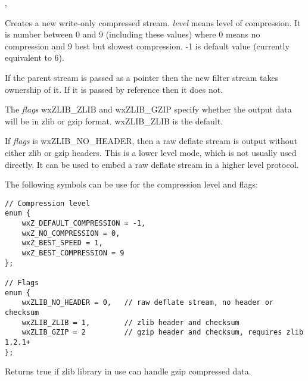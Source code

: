 


,



\label{wxzliboutputstreamwxzliboutputstream}



Creates a new write-only compressed stream. {\it level} means level of 
compression. It is number between 0 and 9 (including these values) where
0 means no compression and 9 best but slowest compression. -1 is default
value (currently equivalent to 6).

If the parent stream is passed as a pointer then the new filter stream
takes ownership of it. If it is passed by reference then it does not.

The {\it flags} wxZLIB\_ZLIB and wxZLIB\_GZIP specify whether the output data
will be in zlib or gzip format. wxZLIB\_ZLIB is the default.

If {\it flags} is wxZLIB\_NO\_HEADER, then a raw deflate stream is output
without either zlib or gzip headers. This is a lower level
mode, which is not usually used directly. It can be used to embed a raw
deflate stream in a higher level protocol.

The following symbols can be use for the compression level and flags:

\begin{verbatim}
// Compression level
enum {
    wxZ_DEFAULT_COMPRESSION = -1,
    wxZ_NO_COMPRESSION = 0,
    wxZ_BEST_SPEED = 1,
    wxZ_BEST_COMPRESSION = 9
};

// Flags
enum {
    wxZLIB_NO_HEADER = 0,   // raw deflate stream, no header or checksum
    wxZLIB_ZLIB = 1,        // zlib header and checksum
    wxZLIB_GZIP = 2         // gzip header and checksum, requires zlib 1.2.1+
};
\end{verbatim}

\label{wxoutputstreamcanhandlegzip}


Returns true if zlib library in use can handle gzip compressed data.

